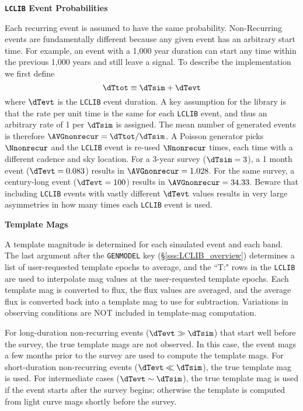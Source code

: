 \documentclass[12pt]{article}
\begin{document}
\medskip \centerline{\bf {\tt LCLIB} Event Probabilities}
Each recurring event is assumed to have the same probability.
Non-Recurring events are fundamentally different because any given 
event has an arbitrary start time. For example, an event with a 1,000 year 
duration can start any time within the previous 1,000 years and still
leave a signal. To describe the implementation we first define
\begin{equation}
    \dTtot \equiv   \dTsim + \dTevt
\end{equation}
%
where $\dTevt$ is the {\tt LCLIB} event duration. 
A key assumption for the library is that the rate per unit time is 
the same for each {\tt LCLIB} event, and thus an arbitrary rate of 
1 per $\dTsim$ is assigned.  The mean number of generated events  
is therefore  $\AVGnonrecur = \dTtot/\dTsim$. 
A Poisson generator picks $\Nnonrecur$ and the {\tt LCLIB} event
is re-used $\Nnonrecur$ times, each time with a different cadence
and sky location. 
For a 3-year survey ($\dTsim=3$), a 1 month event ($\dTevt=0.083$)
results in $\AVGnonrecur = 1.028$. 
For the same survey, a century-long event ($\dTevt=100$) 
results in $\AVGnonrecur = 34.33$.  
Beware that including {\tt LCLIB} events with vastly different 
$\dTevt$ values results in very large asymmetries in how many times
 each {\tt LCLIB} event is used.

\medskip\centerline{\bf Template Mags}
A template magnitude is determined for each simulated event and each band.
The last argument after the {\tt GENMODEL} key  (\S\ref{sss:LCLIB_overview})
determines a list of user-requested template epochs to average, 
and  the ``T:" rows in the {\tt LCLIB} are used to interpolate
mag values at the user-requested template epochs. Each template mag 
is converted to flux, the flux values are averaged, and the average 
flux is converted back into a template mag to use for subtraction. 
Variations in observing conditions are NOT included in template-mag 
computation.

For long-duration non-recurring events ($\dTevt \gg \dTsim$)
that start well before the survey,
the true template mags are not observed. In this case, the event
mags a few months prior to the survey are used to compute the
template mags. For short-duration non-recurring events ($\dTevt \ll \dTsim$),
the true template mag is used. 
For intermediate cases ($\dTevt \sim \dTsim$), the true template mag is
used if the event starts after the survey begins; 
otherwise the template is computed from light curve mags 
shortly before the survey.
\end{document}
